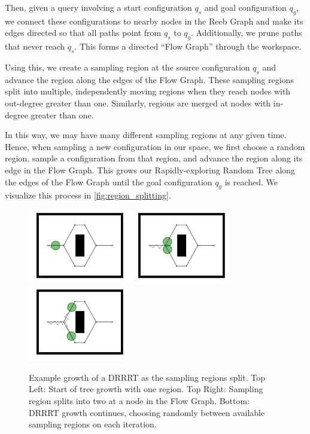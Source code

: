 \documentclass[conference]{IEEEtran}
\begin{document}
Then, given a query involving a start configuration $q_s$ and goal configuration $q_g$, we connect these configurations to nearby nodes in the Reeb Graph and make its edges directed so that all paths point from $q_s$ to $q_g$. Additionally, we prune paths that never reach $q_s$. This forms a directed ``Flow Graph'' through the workspace.

Using this, we create a sampling region at the source configuration $q_s$ and advance the region along the edges of the Flow Graph. These sampling regions split into multiple, independently moving regions when they reach nodes with out-degree greater than one. Similarly, regions are merged at nodes with in-degree greater than one.

In this way, we may have many different sampling regions at any given time. Hence, when sampling a new configuration in our space, we first choose a random region, sample a configuration from that region, and advance the region along its edge in the Flow Graph. This grows our Rapidly-exploring Random Tree along the edges of the Flow Graph until the goal configuration $q_g$ is reached. We visualize this process in \autoref{fig:region_splitting}.

\begin{figure}[h]
	\centering
	\includegraphics[width=1.72in]{figures/split1.pdf}
	\includegraphics[width=1.72in]{figures/split2.pdf}
	\includegraphics[width=1.72in]{figures/split3.pdf}
	\caption{Example growth of a DRRRT as the sampling regions split. Top Left: Start of tree growth with one region. Top Right: Sampling region splits into two at a node in the Flow Graph. Bottom: DRRRT growth continues, choosing randomly between available sampling regions on each iteration.}
	\label{fig:region_splitting}
\end{figure}
\end{document}
